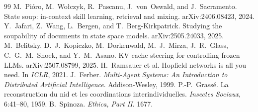 \documentclass[11pt]{article}
\theoremstyle{definition}
\begin{document}
\begin{thebibliography}{99}
 M.~Pi\'oro, M.~Wo\l czyk, R.~Pascanu, J.~von~Oswald, and J.~Sacramento. State soup: in-context skill learning, retrieval and mixing. arXiv:2406.08423, 2024.
 Y.~Jafari, Z.~Wang, L.~Bergen, and T.~Berg-Kirkpatrick. Studying the soupability of documents in state space models. arXiv:2505.24033, 2025.
 M.~Belitsky, D.~J.~Kopiczko, M.~Dorkenwald, M.~J.~Mirza, J.~R.~Glass, C.~G.~M.~Snoek, and Y.~M.~Asano. KV cache steering for controlling frozen LLMs. arXiv:2507.08799, 2025.
 H.~Ramsauer et al. Hopfield networks is all you need. In \emph{ICLR}, 2021.
 J.~Ferber. \emph{Multi-Agent Systems: An Introduction to Distributed Artificial Intelligence}. Addison-Wesley, 1999.
 P.-P.~Grass\'e. La reconstruction du nid et les coordinations interindividuelles. \emph{Insectes Sociaux}, 6:41--80, 1959.
 B.~Spinoza. \emph{Ethica, Part II}. 1677.
\end{thebibliography}
\end{document}
